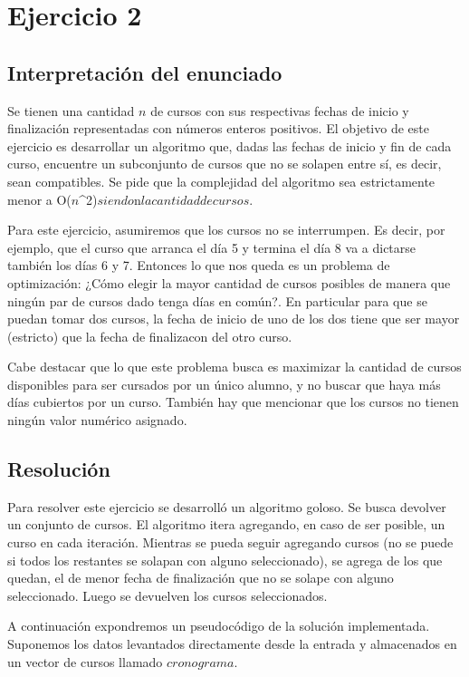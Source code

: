 \section{Ejercicio 2}

\subsection{Interpretación del enunciado}
\par{Se tienen una cantidad $n$ de cursos con sus respectivas fechas de inicio y finalizaci\'on representadas con n\'umeros enteros positivos. El objetivo de este ejercicio es desarrollar un algoritmo que, dadas las fechas de inicio y fin de cada curso, encuentre un subconjunto de cursos que no se solapen entre s\'i, es decir, sean compatibles. Se pide que la complejidad del algoritmo sea estrictamente menor a O($n$^{2})$ siendo $n$ la cantidad de cursos$.}
\par{Para este ejercicio, asumiremos que los cursos no se interrumpen. Es decir, por ejemplo, que el curso que arranca el día 5 y termina el día 8 va a dictarse también los días 6 y 7. Entonces lo que nos queda es un problema de optimización: ¿Cómo elegir la mayor cantidad de cursos posibles de manera que ningún par de cursos dado tenga días en común?. En particular para que se puedan tomar dos cursos, la fecha de inicio de uno de los dos tiene que ser mayor (estricto) que la fecha de finalizacon del otro curso.}
\par{Cabe destacar que lo que este problema busca es maximizar la cantidad de cursos disponibles para ser cursados por un único alumno, y no buscar que haya más días cubiertos por un curso. También hay que mencionar que los cursos no tienen ningún valor numérico asignado.}

\subsection{Resolución}
\par{Para resolver este ejercicio se desarroll\'o un algoritmo goloso. Se busca devolver un conjunto de cursos. El algoritmo itera agregando, en caso de ser posible, un curso en cada iteraci\'on. Mientras se pueda seguir agregando cursos (no se puede si todos los restantes se solapan con alguno seleccionado), se agrega de los que quedan, el de menor fecha de finalizaci\'on que no se solape con alguno seleccionado. Luego se devuelven los cursos seleccionados.}
\par{A continuación expondremos un pseudocódigo de la solución implementada. Suponemos los datos levantados directamente desde la entrada y almacenados en un vector de cursos llamado $cronograma$.}\

